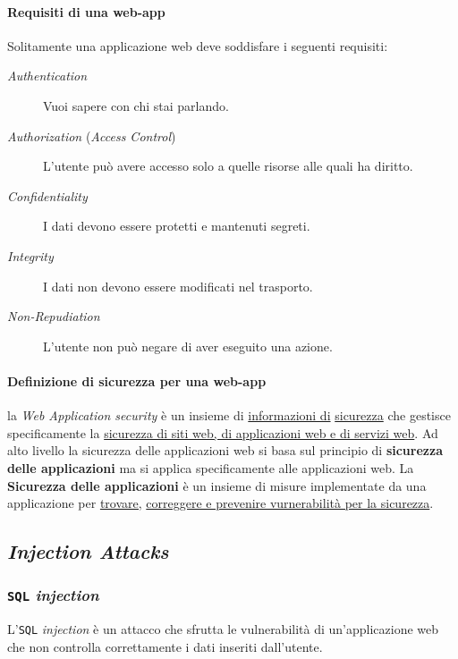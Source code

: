             \paragraph{Requisiti di una web-app} Solitamente una applicazione web deve soddisfare i seguenti requisiti:\begin{description}
                \item[\textit{Authentication}] Vuoi sapere con chi stai parlando.
                \item[\textit{Authorization} (\textit{Access Control})] L'utente può avere accesso solo a quelle risorse alle quali ha diritto.
                \item[\textit{Confidentiality}] I dati devono essere protetti e mantenuti segreti.
                \item[\textit{Integrity}] I dati non devono essere modificati nel trasporto.
                \item[\textit{Non-Repudiation}] L'utente non può negare di aver eseguito una azione.
            \end{description}
            \paragraph{Definizione di sicurezza per una web-app} la \textit{Web Application security} è un insieme di \underline{informazioni di} \underline{sicurezza} che gestisce specificamente la \underline{sicurezza di siti web, di applicazioni web e di servizi web}. Ad alto livello la sicurezza delle applicazioni web si basa sul principio di \textbf{sicurezza delle applicazioni} ma si applica specificamente alle applicazioni web.\newline
            La \textbf{Sicurezza delle applicazioni} è un insieme di misure implementate da una applicazione per \underline{trovare,} \underline{correggere e prevenire vurnerabilità per la sicurezza}.
    \subsection{\textit{Injection Attacks}}
        \subsubsection{\texttt{SQL} \textit{injection}}
            L'\texttt{SQL} \textit{injection} è un attacco che sfrutta le vulnerabilità di un'applicazione web che non controlla correttamente i dati inseriti dall'utente.
